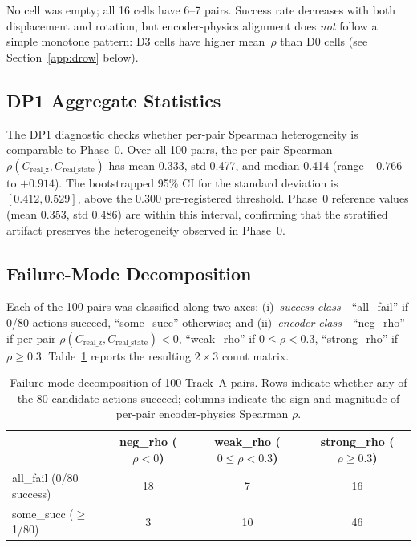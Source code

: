 No cell was empty; all 16 cells have 6--7 pairs.  Success rate decreases with
both displacement and rotation, but encoder-physics alignment does
\emph{not} follow a simple monotone pattern: D3 cells have higher mean~$\rho$
than D0 cells (see Section~\ref{app:drow} below).

\subsection{DP1 Aggregate Statistics}
\label{app:dp1}

The DP1 diagnostic checks whether per-pair Spearman heterogeneity is
comparable to Phase~0.  Over all 100 pairs, the per-pair Spearman
$\rho(C_\text{real\_z}, C_\text{real\_state})$ has mean 0.333, std 0.477,
and median 0.414 (range $-0.766$ to $+0.914$).  The bootstrapped 95\% CI for
the standard deviation is $[0.412, 0.529]$, above the 0.300 pre-registered
threshold.  Phase~0 reference values (mean 0.353, std 0.486) are within this
interval, confirming that the stratified artifact preserves the heterogeneity
observed in Phase~0.

\subsection{Failure-Mode Decomposition}
\label{app:failure_decomp}

Each of the 100 pairs was classified along two axes: (i)~\emph{success
class}---``all\_fail'' if 0/80 actions succeed, ``some\_succ'' otherwise; and
(ii)~\emph{encoder class}---``neg\_rho'' if per-pair
$\rho(C_\text{real\_z}, C_\text{real\_state}) < 0$, ``weak\_rho'' if
$0 \le \rho < 0.3$, ``strong\_rho'' if $\rho \ge 0.3$.
Table~\ref{tab:failure-decomp} reports the resulting $2\times 3$ count
matrix.

\begin{table}[h]
\centering
\caption{Failure-mode decomposition of 100 Track~A pairs.  Rows indicate
whether any of the 80 candidate actions succeed; columns indicate the sign
and magnitude of per-pair encoder-physics Spearman $\rho$.}
\label{tab:failure-decomp}
\begin{tabular}{lccc}
\toprule
 & neg\_rho ($\rho<0$) & weak\_rho ($0\le\rho<0.3$) & strong\_rho ($\rho\ge 0.3$) \\
\midrule
all\_fail (0/80 success) & 18 & 7 & 16 \\
some\_succ ($\ge$1/80) & 3 & 10 & 46 \\
\bottomrule
\end{tabular}
\end{table}

